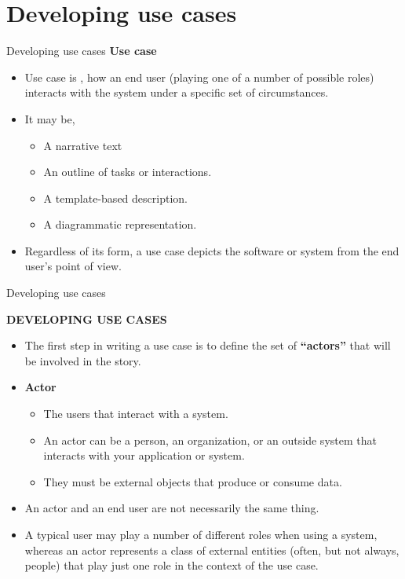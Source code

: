 \documentclass{beamer}
\begin{document}
\section{Developing use cases}
\begin{frame}{Developing use cases}
	\textbf{Use case}
\begin{itemize}
	\item Use case is , how an end user (playing one of a number of possible roles) interacts with the system under a specific set of circumstances. 
	\item It may be,
	\begin{itemize}
		\item A narrative text
		\item An outline of tasks or interactions.
		\item A template-based description.
		\item A diagrammatic representation. 
	\end{itemize}
\item Regardless of its form, a use case depicts the software or system from the end user’s point of view.
\end{itemize}
\end{frame}
\begin{frame}{Developing use cases}
	
\textbf{DEVELOPING USE CASES}
\begin{itemize}
	\item 	The first step in writing a use case is to define the set of \textbf{“actors”} that will be involved in the story.
   \item \textbf{Actor}
	\begin{itemize}
		\item The users that interact with a system. 
		\item An actor can be a person, an organization, or an outside system that interacts with your application or system.
		\item They must be external objects that produce or consume data.
	\end{itemize}
\item An actor and an end user are not necessarily the same thing.
\item A typical user may play a number of different roles when using a system, whereas an actor represents a class of external entities (often, but not always, people) that play just one role in the context of the use case. 
\end{itemize}
\end{frame}
\end{document}
